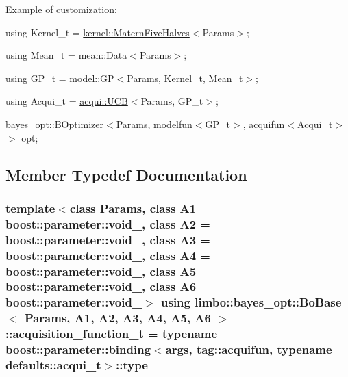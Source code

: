 Example of customization\+:
\begin{DoxyItemize}
\item {\ttfamily using Kernel\+\_\+t = \hyperlink{structlimbo_1_1kernel_1_1_matern_five_halves}{kernel\+::\+Matern\+Five\+Halves}$<$Params$>$;}
\item {\ttfamily using Mean\+\_\+t = \hyperlink{structlimbo_1_1mean_1_1_data}{mean\+::\+Data}$<$Params$>$;}
\item {\ttfamily using G\+P\+\_\+t = \hyperlink{classlimbo_1_1model_1_1_g_p}{model\+::\+GP}$<$Params, Kernel\+\_\+t, Mean\+\_\+t$>$;}
\item {\ttfamily using Acqui\+\_\+t = \hyperlink{classlimbo_1_1acqui_1_1_u_c_b}{acqui\+::\+U\+CB}$<$Params, G\+P\+\_\+t$>$;}
\item {\ttfamily \hyperlink{classlimbo_1_1bayes__opt_1_1_b_optimizer}{bayes\+\_\+opt\+::\+B\+Optimizer}$<$Params, modelfun$<$G\+P\+\_\+t$>$, acquifun$<$Acqui\+\_\+t$>$$>$ opt;} 
\end{DoxyItemize}

\subsection{Member Typedef Documentation}
\subsubsection[{\texorpdfstring{acquisition\+\_\+function\+\_\+t}{acquisition_function_t}}]{\setlength{\rightskip}{0pt plus 5cm}template$<$class Params, class A1 = boost\+::parameter\+::void\+\_\+, class A2 = boost\+::parameter\+::void\+\_\+, class A3 = boost\+::parameter\+::void\+\_\+, class A4 = boost\+::parameter\+::void\+\_\+, class A5 = boost\+::parameter\+::void\+\_\+, class A6 = boost\+::parameter\+::void\+\_\+$>$ using {\bf limbo\+::bayes\+\_\+opt\+::\+Bo\+Base}$<$ Params, A1, A2, A3, A4, A5, A6 $>$\+::{\bf acquisition\+\_\+function\+\_\+t} =  typename boost\+::parameter\+::binding$<${\bf args}, tag\+::acquifun, typename {\bf defaults\+::acqui\+\_\+t}$>$\+::type}\hypertarget{classlimbo_1_1bayes__opt_1_1_bo_base_a5abe502b49e1ee70d5e00f27f95f5dff}{}\label{classlimbo_1_1bayes__opt_1_1_bo_base_a5abe502b49e1ee70d5e00f27f95f5dff}
